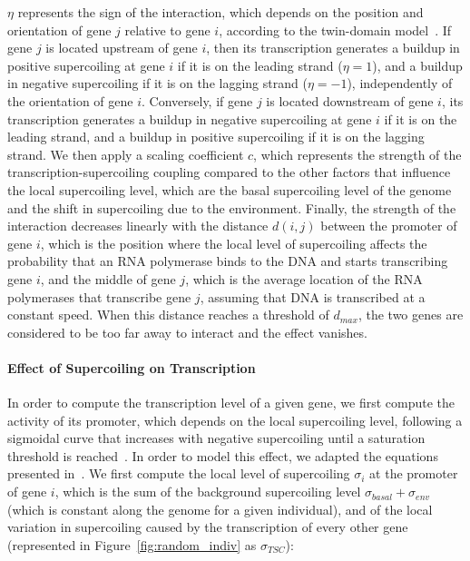 $\eta$ represents the sign of the interaction, which depends on the position and orientation of gene $j$ relative to gene $i$, according to the twin-domain model~\citep{liu1987}.
If gene $j$ is located upstream of gene $i$, then its transcription generates a buildup in positive supercoiling at gene $i$ if it is on the leading strand ($\eta = 1$), and a buildup in negative supercoiling if it is on the lagging strand ($\eta = -1$), independently of the orientation of gene $i$.
Conversely, if gene $j$ is located downstream of gene $i$, its transcription generates a buildup in negative supercoiling at gene $i$ if it is on the leading strand, and a buildup in positive supercoiling if it is on the lagging strand.
We then apply a scaling coefficient $c$, which represents the strength of the transcription-supercoiling coupling compared to the other factors that influence the local supercoiling level, which are the basal supercoiling level of the genome and the shift in supercoiling due to the environment.
Finally, the strength of the interaction decreases linearly with the distance $d(i, j)$ between the promoter of gene $i$, which is the position where the local level of supercoiling affects the probability that an RNA polymerase binds to the DNA and starts transcribing gene $i$, and the middle of gene $j$, which is the average location of the RNA polymerases that transcribe gene $j$, assuming that DNA is transcribed at a constant speed.
When this distance reaches a threshold of $d_{max}$, the two genes are considered to be too far away to interact and the effect vanishes.

\paragraph{Effect of Supercoiling on Transcription}
In order to compute the transcription level of a given gene, we first compute the activity of its promoter, which depends on the local supercoiling level, following a sigmoidal curve that increases with negative supercoiling until a saturation threshold is reached~\citep{forquet2021}.
In order to model this effect, we adapted the equations presented in~\cite{elhoudaigui2019}.
We first compute the local level of supercoiling $\sigma_i$ at the promoter of gene $i$, which is the sum of the background supercoiling level $\sigma_{basal} + \sigma_{env}$ (which is constant along the genome for a given individual), and of the local variation in supercoiling caused by the transcription of every other gene (represented in Figure~\ref{fig:random_indiv} as $\sigma_{TSC}$):

